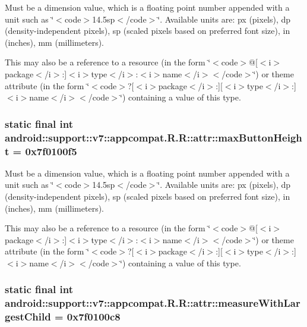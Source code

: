 Must be a dimension value, which is a floating point number appended with a unit such as \char`\"{}$<$code$>$14.5sp$<$/code$>$\char`\"{}. Available units are: px (pixels), dp (density-independent pixels), sp (scaled pixels based on preferred font size), in (inches), mm (millimeters). 

This may also be a reference to a resource (in the form \char`\"{}$<$code$>$@\mbox{[}$<$i$>$package$<$/i$>$:\mbox{]}$<$i$>$type$<$/i$>$:$<$i$>$name$<$/i$>$$<$/code$>$\char`\"{}) or theme attribute (in the form \char`\"{}$<$code$>$?\mbox{[}$<$i$>$package$<$/i$>$:\mbox{]}\mbox{[}$<$i$>$type$<$/i$>$:\mbox{]}$<$i$>$name$<$/i$>$$<$/code$>$\char`\"{}) containing a value of this type. \hypertarget{classandroid_1_1support_1_1v7_1_1appcompat_1_1_r_1_1attr_57558e1eb5d07c7247dc83cfd0e7b111}{
\subsubsection[{maxButtonHeight}]{\setlength{\rightskip}{0pt plus 5cm}static final int android::support::v7::appcompat.R.R::attr::maxButtonHeight = 0x7f0100f5}}
\label{classandroid_1_1support_1_1v7_1_1appcompat_1_1_r_1_1attr_57558e1eb5d07c7247dc83cfd0e7b111}


Must be a dimension value, which is a floating point number appended with a unit such as \char`\"{}$<$code$>$14.5sp$<$/code$>$\char`\"{}. Available units are: px (pixels), dp (density-independent pixels), sp (scaled pixels based on preferred font size), in (inches), mm (millimeters). 

This may also be a reference to a resource (in the form \char`\"{}$<$code$>$@\mbox{[}$<$i$>$package$<$/i$>$:\mbox{]}$<$i$>$type$<$/i$>$:$<$i$>$name$<$/i$>$$<$/code$>$\char`\"{}) or theme attribute (in the form \char`\"{}$<$code$>$?\mbox{[}$<$i$>$package$<$/i$>$:\mbox{]}\mbox{[}$<$i$>$type$<$/i$>$:\mbox{]}$<$i$>$name$<$/i$>$$<$/code$>$\char`\"{}) containing a value of this type. \hypertarget{classandroid_1_1support_1_1v7_1_1appcompat_1_1_r_1_1attr_0b590eeac7d94aac5c991d7c93bb054d}{
\subsubsection[{measureWithLargestChild}]{\setlength{\rightskip}{0pt plus 5cm}static final int android::support::v7::appcompat.R.R::attr::measureWithLargestChild = 0x7f0100c8}}
\label{classandroid_1_1support_1_1v7_1_1appcompat_1_1_r_1_1attr_0b590eeac7d94aac5c991d7c93bb054d}


